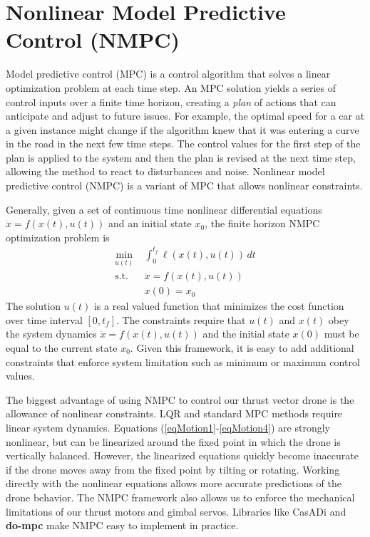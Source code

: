 \documentclass[]{article}
\newcommand{\mpc}{MPC}
\newcommand{\nmpc}{NMPC}
\newcommand{\casadi}{CasADi}
\newcommand{\dompc}{{\bf do-mpc}}
\begin{document}
	


\section*{Nonlinear Model Predictive Control (NMPC)}

	Model predictive control (\mpc) is a control algorithm that solves a linear optimization problem at each time step.
	An {\mpc} solution yields a series of control inputs over a finite time horizon, creating a {\em plan} of actions that can anticipate and adjust to future issues. For example, the optimal speed for a car at a given instance might change if the algorithm knew that it was entering a curve in the road in the next few time steps.  The control values for the first  step of the plan is applied to the system and then the plan is revised at the next time step, allowing the method to react to disturbances and noise. Nonlinear model predictive control (\nmpc) is a variant of {\mpc} that allows nonlinear constraints. 

	Generally, given a set of continuous time nonlinear differential equations $\dot{x} = f(x(t),u(t))$  and an initial state $x_0$, the finite horizon {\nmpc} optimization problem is
	\begin{align*}
		\min_{u(t)} \; & \int_{0}^{t_f} \ell(x(t),u(t))\,dt  \\
		\text{s.t.} \;\; & \dot{x} =  f(x(t),u(t)) \\
		& x(0) = x_0 
	\end{align*}
	The solution $u(t)$ is a real valued function that minimizes the cost function over time interval $[0, t_f]$. The constraints require that  $u(t)$ and $x(t)$ obey the system dynamics $\dot{x} =  f(x(t),u(t)) $ and the  initial state $x(0)$ must be equal to the current state $x_0$.   Given this framework, it is easy to add additional constraints that enforce system limitation such as minimum or maximum control values.

	The biggest advantage of using {\nmpc} to control our thrust vector drone is the allowance of nonlinear constraints. LQR and standard {\mpc} methods  require linear system dynamics.
	 Equations (\ref{eqMotion1}-\ref{eqMotion4}) are strongly nonlinear, but can be linearized around the fixed point in which the drone is vertically balanced.  However, the linearized equations quickly become inaccurate if the drone moves away from the fixed point by tilting or rotating.  Working directly with the nonlinear equations allows more accurate predictions of the drone behavior. The {\nmpc} framework also allows us to enforce the mechanical limitations of our thrust motors and gimbal servos.  Libraries like {\casadi} \citep{casadi} and {\dompc} \citep{do-mpc} make {\nmpc} easy to implement in practice.
 
\end{document}
